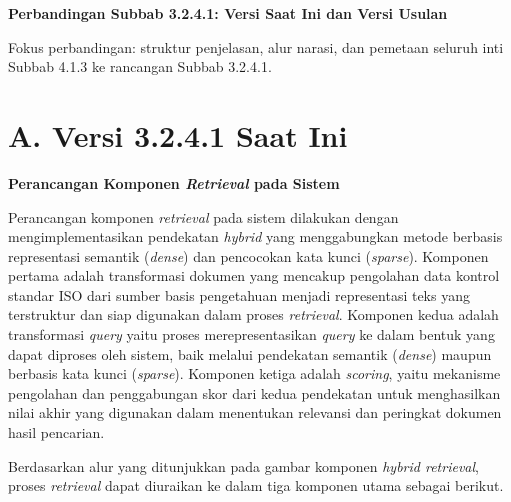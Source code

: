 \documentclass[12pt,a4paper]{article}
\begin{document}
\begin{center}
\textbf{Perbandingan Subbab 3.2.4.1: Versi Saat Ini dan Versi Usulan}\par
\vspace{6pt}
Fokus perbandingan: struktur penjelasan, alur narasi, dan pemetaan seluruh inti Subbab 4.1.3 ke rancangan Subbab 3.2.4.1.
\end{center}

\section*{A. Versi 3.2.4.1 Saat Ini}

\textbf{Perancangan Komponen \textit{Retrieval} pada Sistem}

Perancangan komponen \textit{retrieval} pada sistem dilakukan dengan mengimplementasikan pendekatan \textit{hybrid} yang menggabungkan metode berbasis representasi semantik (\textit{dense}) dan pencocokan kata kunci (\textit{sparse}). Komponen pertama adalah transformasi dokumen yang mencakup pengolahan data kontrol standar ISO dari sumber basis pengetahuan menjadi representasi teks yang terstruktur dan siap digunakan dalam proses \textit{retrieval}. Komponen kedua adalah transformasi \textit{query} yaitu proses merepresentasikan \textit{query} ke dalam bentuk yang dapat diproses oleh sistem, baik melalui pendekatan semantik (\textit{dense}) maupun berbasis kata kunci (\textit{sparse}). Komponen ketiga adalah \textit{scoring}, yaitu mekanisme pengolahan dan penggabungan skor dari kedua pendekatan untuk menghasilkan nilai akhir yang digunakan dalam menentukan relevansi dan peringkat dokumen hasil pencarian.

Berdasarkan alur yang ditunjukkan pada gambar komponen \textit{hybrid retrieval}, proses \textit{retrieval} dapat diuraikan ke dalam tiga komponen utama sebagai berikut.
\end{document}
